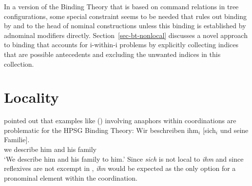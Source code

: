 \documentclass[output=paper
	        ,collection
	        ,collectionchapter
 	        ,biblatex
                ,babelshorthands
                ,newtxmath
                ,draftmode
                ,colorlinks, citecolor=brown
]{langscibook}
\begin{document}
In a version of the Binding Theory that is based on command relations in tree configurations, some
special constraint seems to be needed that rules out binding by and to the head of nominal 
constructions unless this binding is established by adnominal modifiers directly. Section~\ref{sec-bt-nonlocal}
discusses a novel approach to binding that accounts for i-within-i problems by explicitly collecting
indices that are possible antecedents and excluding the unwanted indices in this collection.%





\section{Locality}
\label{binding:sec-locality}

\citet[Section~20.4.7]{Mueller99a} pointed out that examples like () involving anaphors
within coordinations are problematic for the HPSG Binding Theory:
\ea
\label{ex-sich-und-seine-familie}
\gll Wir beschreiben ihm$_{i}$ [sich$_{i}$       und seine Familie].\\
     we describe     him      \spacebr{}\self{} and his family\\
\glt `We describe him and his family to him.'
\z
Since \emph{sich} is not local to \emph{ihm} and since reflexives are not excempt in 
\citep[--159]{Kiss2012a}, \emph{ihn} would be expected as the only option for a pronominal element within
the coordination.
\end{document}
